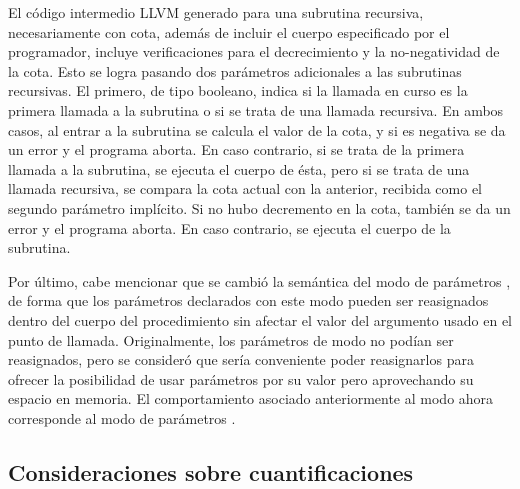 El código intermedio LLVM generado para una subrutina recursiva, necesariamente
con cota, además de incluir el cuerpo especificado por el programador, incluye
verificaciones para el decrecimiento y la no-negatividad de la cota. Esto se
logra pasando dos parámetros adicionales a las subrutinas recursivas. El
primero, de tipo booleano, indica si la llamada en curso es la primera llamada a
la subrutina o si se trata de una llamada recursiva. En ambos casos, al entrar a
la subrutina se calcula el valor de la cota, y si es negativa se da un error y
el programa aborta. En caso contrario, si se trata de la primera llamada a la
subrutina, se ejecuta el cuerpo de ésta, pero si se trata de una llamada
recursiva, se compara la cota actual con la anterior, recibida como el segundo
parámetro implícito. Si no hubo decremento en la cota, también se da un error y
el programa aborta. En caso contrario, se ejecuta el cuerpo de la subrutina.

Por último, cabe mencionar que se cambió la semántica del modo de parámetros
, de forma que los parámetros declarados con este modo pueden ser
reasignados dentro del cuerpo del procedimiento sin afectar el valor del
argumento usado en el punto de llamada. Originalmente, los parámetros de modo
 no podían ser reasignados, pero se consideró que sería conveniente
poder reasignarlos para ofrecer la posibilidad de usar parámetros por su valor
pero aprovechando su espacio en memoria. El comportamiento asociado
anteriormente al modo  ahora corresponde al modo de parámetros
.

\subsection{Consideraciones sobre cuantificaciones}

